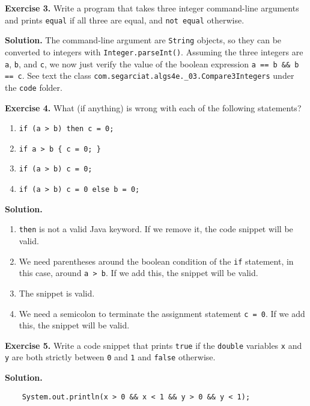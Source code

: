 \documentclass[12pt, a4paper]{article}
\newenvironment{ex}[2][Exercise]
{\par\medskip\noindent \textbf{#1 #2.}}
{\medskip}
\newenvironment{sol}[1][Solution]
{\par\medskip\noindent \textbf{#1.} }
{\medskip}
\begin{document}
	\begin{ex}{3}
		Write a program that takes three integer command-line arguments and prints
		\texttt{equal} if all three are equal, and \texttt{not equal} otherwise.
	\end{ex}
	\begin{sol}
		The command-line argument are \texttt{String} objects, so they can be converted
		to integers with \texttt{Integer.parseInt()}. Assuming the three integers are
		\texttt{a}, \texttt{b}, and \texttt{c}, we now just verify the value of the
		boolean expression \texttt{a == b \&\& b == c}. See text the class
		\texttt{com.segarciat.algs4e.\_03.Compare3Integers} under the \texttt{code}
		folder.
	\end{sol}
	\begin{ex}{4}
		What (if anything) is wrong with each of the following statements?
		\begin{enumerate}[label=(\alph*)]
			\item \texttt{if (a > b) then c = 0;}
			\item \texttt{if a > b \{ c = 0; \}}
			\item \texttt{if (a > b) c = 0;}
			\item \texttt{if (a > b) c = 0 else b = 0;}
		\end{enumerate}
	\end{ex}
	\begin{sol}
		\
		\begin{enumerate}[label=(\alph*)]
			\item \texttt{then} is not a valid Java keyword. If we remove it, the code snippet
			will be valid.
			\item We need parentheses around the boolean condition of the \texttt{if} statement,
			in this case, around \texttt{a > b}. If we add this, the snippet will be valid.
			\item The snippet is valid.
			\item We need a semicolon to terminate the assignment statement \texttt{c = 0}.
			If we add this, the snippet will be valid.
		\end{enumerate}
	\end{sol}
	\begin{ex}{5}
		Write a code  snippet that prints \texttt{true} if the \texttt{double} variables
		\texttt{x} and \texttt{y} are both strictly between \texttt{0} and \texttt{1}
		and \texttt{false} otherwise.
	\end{ex}
	\begin{sol}
		\
		\begin{lstlisting}
	System.out.println(x > 0 && x < 1 && y > 0 && y < 1);
		\end{lstlisting}
	\end{sol}
\end{document}
